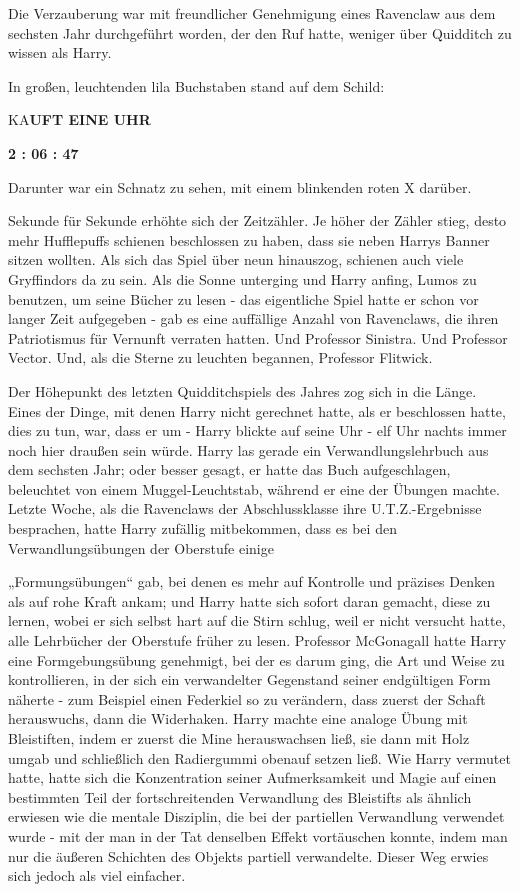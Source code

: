 {Die Verzauberung war mit freundlicher Genehmigung eines Ravenclaw aus dem sechsten Jahr durchgeführt worden, der den Ruf hatte, weniger über Quidditch zu wissen als Harry.

In großen, leuchtenden lila Buchstaben stand auf dem Schild:

KA\textbf{UFT EINE UHR}

\textbf{2 : 06 : 47}

Darunter war ein Schnatz zu sehen, mit einem blinkenden roten X darüber.

Sekunde für Sekunde erhöhte sich der Zeitzähler. Je höher der Zähler stieg, desto mehr Hufflepuffs schienen beschlossen zu haben, dass sie neben Harrys Banner sitzen wollten. Als sich das Spiel über neun hinauszog, schienen auch viele Gryffindors da zu sein. Als die Sonne unterging und Harry anfing, Lumos zu benutzen, um seine Bücher zu lesen - das eigentliche Spiel hatte er schon vor langer Zeit aufgegeben - gab es eine auffällige Anzahl von Ravenclaws, die ihren Patriotismus für Vernunft verraten hatten. Und Professor Sinistra. Und Professor Vector. Und, als die Sterne zu leuchten begannen, Professor Flitwick.

Der Höhepunkt des letzten Quidditchspiels des Jahres zog sich in die Länge. Eines der Dinge, mit denen Harry nicht gerechnet hatte, als er beschlossen hatte, dies zu tun, war, dass er um - Harry blickte auf seine Uhr - elf Uhr nachts immer noch hier draußen sein würde. Harry las gerade ein Verwandlungslehrbuch aus dem sechsten Jahr; oder besser gesagt, er hatte das Buch aufgeschlagen, beleuchtet von einem Muggel-Leuchtstab, während er eine der Übungen machte. Letzte Woche, als die Ravenclaws der Abschlussklasse ihre U.T.Z.-Ergebnisse besprachen, hatte Harry zufällig mitbekommen, dass es bei den Verwandlungsübungen der Oberstufe einige

„Formungsübungen“ gab, bei denen es mehr auf Kontrolle und präzises Denken als auf rohe Kraft ankam; und Harry hatte sich sofort daran gemacht, diese zu lernen, wobei er sich selbst hart auf die Stirn schlug, weil er nicht versucht hatte, alle Lehrbücher der Oberstufe früher zu lesen. Professor McGonagall hatte Harry eine Formgebungsübung genehmigt, bei der es darum ging, die Art und Weise zu kontrollieren, in der sich ein verwandelter Gegenstand seiner endgültigen Form näherte - zum Beispiel einen Federkiel so zu verändern, dass zuerst der Schaft herauswuchs, dann die Widerhaken. Harry machte eine analoge Übung mit Bleistiften, indem er zuerst die Mine herauswachsen ließ, sie dann mit Holz umgab und schließlich den Radiergummi obenauf setzen ließ. Wie Harry vermutet hatte, hatte sich die Konzentration seiner Aufmerksamkeit und Magie auf einen bestimmten Teil der fortschreitenden Verwandlung des Bleistifts als ähnlich erwiesen wie die mentale Disziplin, die bei der partiellen Verwandlung verwendet wurde - mit der man in der Tat denselben Effekt vortäuschen konnte, indem man nur die äußeren Schichten des Objekts partiell verwandelte. Dieser Weg erwies sich jedoch als viel einfacher.

}
